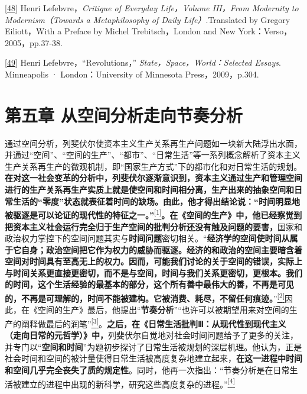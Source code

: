 \documentclass[UTF8, fontset = sourcesans, a4paper, oneside, zihao =
-4, scheme=chinese, no-math, space=true]{ctexbook}
\begin{document}
\protect\hypertarget{part0008_split_003.htmlux5cux23m48}{}{}\protect\hyperlink{part0008_split_003.htmlux5cux23w48}{{[}48{]}}
Henri Lefebvre，\emph{Critique of Everyday Life，Volume III，From
Modernity to Modernism（Towards a Metaphilosophy of Daily
Life）}.Translated by Gregory Eiliott，With a Preface by Michel
Trebitsch，London and New York：Verso，2005，pp.37-38.

\protect\hypertarget{part0008_split_003.htmlux5cux23m49}{}{}\protect\hyperlink{part0008_split_003.htmlux5cux23w49}{{[}49{]}}
Henri Lefebvre，``Revolutions，'' \emph{State，Space，World：Selected
Essays}. Minneapolis · London：University of Minnesota
Press，2009，p.304.

\protect\hypertarget{part0009_split_000.html}{}{}

\hypertarget{part0009_split_000.htmlux5cux23a009}{\chapter{第五章
从空间分析走向节奏分析}\label{part0009_split_000.htmlux5cux23a009}}

通过空间分析，列斐伏尔使资本主义生产关系再生产问题如一块新大陆浮出水面，并通过``空间''、``空间的生产''、``都市''、``日常生活''等一系列概念解析了资本主义生产关系再生产的微观机制，即``国家生产方式''下的都市化和对日常生活的规划。\textbf{在对这一社会变革的分析中，列斐伏尔逐渐意识到，资本主义通过生产和管理空间进行的生产关系再生产实质上就是使空间和时间相分离，生产出来的抽象空间和日常生活的``零度''状态就表征着时间的缺场。由此，他才得出结论说：``时间明显地被驱逐是可以论证的现代性的特征之一。''}\protect\hypertarget{part0009_split_000.htmlux5cux23w1}{}{}\protect\hyperlink{part0009_split_004.htmlux5cux23m1}{\textsuperscript{{[}1{]}}}\textbf{。在《空间的生产》中，他已经察觉到把资本主义社会运行完全归于生产空间的批判分析还没有触及问题的要害，}国家和政治权力掌控下的空间问题其实与\textbf{时间问题}密切相关。``\textbf{经济学的空间使时间从属于它自身；政治空间把它作为权力的威胁而驱逐。经济的和政治的空间主要暗含着空间对时间具有至高无上的权力。因而，可能我们讨论的关于空间的错误，实际上与时间关系更直接更密切，而不是与空间，时间与我们关系更密切，更根本。我们的时间，这个生活经验的最基本的部分，这个所有善中最伟大的善，不再是可见的，不再是可理解的，时间不能被建构。它被消费、耗尽，不留任何痕迹。}''\protect\hypertarget{part0009_split_000.htmlux5cux23w2}{}{}\protect\hyperlink{part0009_split_004.htmlux5cux23m2}{\textsuperscript{{[}2{]}}}因此，在《空间的生产》最后，他提出``\textbf{节奏分析}''``也许可以被期望用来对空间的生产的阐释做最后的润笔''\protect\hypertarget{part0009_split_000.htmlux5cux23w3}{}{}\protect\hyperlink{part0009_split_004.htmlux5cux23m3}{\textsuperscript{{[}3{]}}}。\textbf{之后，在《日常生活批判Ⅲ：从现代性到现代主义（走向日常的元哲学）》中，}列斐伏尔自觉地对社会时间问题给予了更多的关注，并专门以``\textbf{空间和时间}''为题初步探讨了日常生活被规划的深层机理。他认为，正是社会时间和空间的被计量使得日常生活被高度复杂地建立起来，\textbf{在这一进程中时间和空间几乎完全丧失了质的规定性}。同时，他再一次指出：``节奏分析是在日常生活被建立的进程中出现的新科学，研究这些高度复杂的进程。''\protect\hypertarget{part0009_split_000.htmlux5cux23w4}{}{}\protect\hyperlink{part0009_split_004.htmlux5cux23m4}{\textsuperscript{{[}4{]}}}
\end{document}
